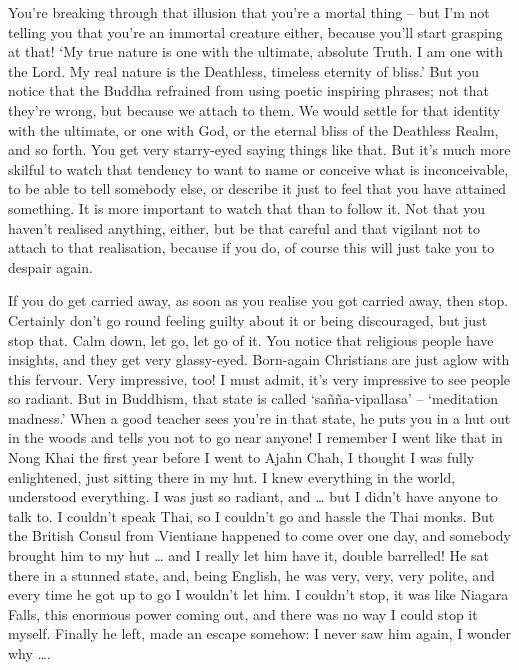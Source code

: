 You're breaking through that illusion that you're a mortal thing -- but I'm not telling you that you're an immortal creature either, because you'll start grasping at that! `My true nature is one with the ultimate, absolute Truth. I am one with the Lord. My real nature is the Deathless, timeless eternity of bliss.' But you notice that the Buddha refrained from using poetic inspiring phrases; not that they're wrong, but because we attach to them. We would settle for that identity with the ultimate, or one with God, or the eternal bliss of the Deathless Realm, and so forth. You get very starry-eyed saying things like that. But it's much more skilful to watch that tendency to want to name or conceive what is inconceivable, to be able to tell somebody else, or describe it just to feel that you have attained something. It is more important to watch that than to follow it. Not that you haven't realised anything, either, but be that careful and that vigilant not to attach to that realisation, because if you do, of course this will just take you to despair again.

If you do get carried away, as soon as you realise you got carried away, then stop. Certainly don't go round feeling guilty about it or being discouraged, but just stop that. Calm down, let go, let go of it. You notice that religious people have insights, and they get very glassy-eyed. Born-again Christians are just aglow with this fervour. Very impressive, too! I must admit, it's very impressive to see people so radiant. But in Buddhism, that state is called `sañña-vipallasa' -- `meditation madness.' When a good teacher sees you're in that state, he puts you in a hut out in the woods and tells you not to go near anyone! I remember I went like that in Nong Khai the first year before I went to Ajahn Chah, I thought I was fully enlightened, just sitting there in my hut. I knew everything in the world, understood everything. I was just so radiant, and \ldots{} but I didn't have anyone to talk to. I couldn't speak Thai, so I couldn't go and hassle the Thai monks. But the British Consul from Vientiane happened to come over one day, and somebody brought him to my hut \ldots{} and I really let him have it, double barrelled! He sat there in a stunned state, and, being English, he was very, very, very polite, and every time he got up to go I wouldn't let him. I couldn't stop, it was like Niagara Falls, this enormous power coming out, and there was no way I could stop it myself. Finally he left, made an escape somehow: I never saw him again, I wonder why \ldots{}.

